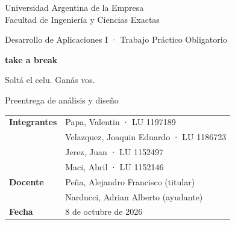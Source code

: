 \begin{titlepage}
\pagecolor{bosque}\color{white}
\renewcommand{\pendiente}[1]{\textcolor{lima}{[#1]}}
\vspace*{1.5cm}
{\large Universidad Argentina de la Empresa\\Facultad de Ingeniería y Ciencias Exactas\par}
\vspace{0.4cm}
{\large Desarrollo de Aplicaciones I · Trabajo Práctico Obligatorio\par}

\vspace{4cm}
{\fontsize{46}{50}\selectfont\bfseries take a break\par}
\vspace{0.3cm}
{\LARGE\color{lima} Soltá el celu. Ganás vos.\par}
\vspace{0.8cm}
{\Large Preentrega de análisis y diseño\par}

\vfill
\begin{tabular}{@{}ll@{}}
\textbf{Integrantes} & Papa, Valentin · LU 1197189 \\
                     & Velazquez, Joaquin Eduardo · LU 1186723 \\
                     & Jerez, Juan · LU 1152497 \\
                     & Maci, Abril · LU 1152146 \\
\textbf{Docente}     & Peña, Alejandro Francisco (titular) \\
                     & Narducci, Adrian Alberto (ayudante) \\
\textbf{Fecha}       & 8 de octubre de 2026 \\
\end{tabular}
\end{titlepage}
\nopagecolor\color{black}

\tableofcontents
\newpage
